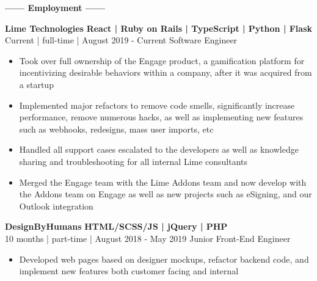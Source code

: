 \documentclass[12pt]{article}
\begin{document}
    \begin{center}
    \textbf{\Large------ Employment ------}\\
    \end{center}
    \vspace{-2mm}
    \begin{footnotesize}
    \flushleft
    \textbf{\color{primary}\large Lime Technologies} \hfill \textbf{\color{Cerulean}React | Ruby on Rails | TypeScript | Python | Flask }\\ 
    {\color{primary}Current | full-time | August 2019 - Current} \hfill {\color{Cerulean} Software Engineer}
    \vspace{-2mm}
    \begin{itemize}
        \setlength{\itemsep}{0pt}
        \item Took over full ownership of the Engage product, a gamification platform for incentivizing desirable behaviors within a company, after it was acquired from a startup
        \item Implemented major refactors to remove code smells, significantly increase performance, remove numerous hacks, as well as implementing new features such as webhooks, redesigns, mass user imports, etc
        \item Handled all support cases escalated to the developers as well as knowledge sharing and troubleshooting for all internal Lime consultants
        \item Merged the Engage team with the Lime Addons team and now develop with the Addons team on Engage as well as new projects such as eSigning, and our Outlook integration
    \end{itemize}
    
    \flushleft
    
    \textbf{\color{primary}\large DesignByHumans} \hfill \textbf{\color{Cerulean}HTML/SCSS/JS | jQuery | PHP}\\ 
    {\color{primary}10 months | part-time | August 2018 - May 2019} \hfill {\color{Cerulean} Junior Front-End Engineer}
    \vspace{-2mm}
    \begin{itemize}
        \setlength{\itemsep}{0pt}
        \item Developed web pages based on designer mockups, refactor backend code, and implement new features both customer facing and internal
    \end{itemize}
    \end{footnotesize}
    
\end{document}
